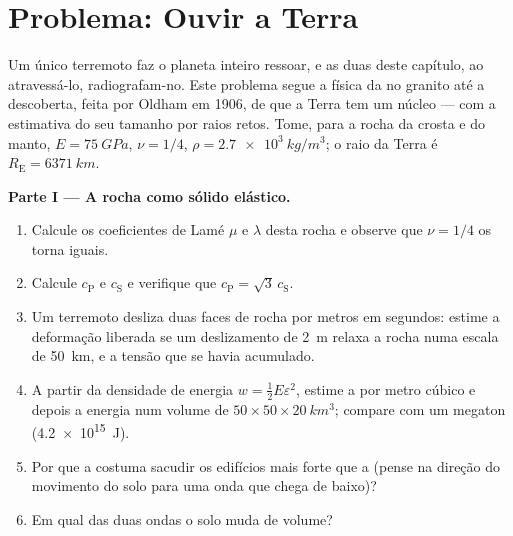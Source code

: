 \section{Problema: Ouvir a Terra}

\begin{problem}\label{pb:b3:continuum-elasticity:1}
Um único terremoto faz o planeta inteiro ressoar, e as duas  deste capítulo, ao atravessá-lo, radiografam-no. Este
problema segue a física da  no granito até a descoberta,
feita por Oldham em 1906, de que a Terra tem um núcleo --- com a
estimativa do seu tamanho por raios retos. Tome, para a rocha da
crosta e do manto, $E = \qty{75}{GPa}$, $\nu = 1/4$,
$\rho = \qty{2.7e3}{kg/m^3}$; o raio da Terra é $R_{\text{E}} =
\qty{6371}{km}$.

\medskip\noindent\textbf{Parte I --- A rocha como sólido elástico.}
\begin{enumerate}
  \item Calcule os coeficientes de Lamé $\mu$ e $\lambda$ desta rocha
        e observe que $\nu = 1/4$ os torna iguais.
  \item Calcule $c_{\text{P}}$ e $c_{\text{S}}$ e verifique que
        $c_{\text{P}} = \sqrt3\,c_{\text{S}}$.
  \item Um terremoto desliza duas faces de rocha por metros em
        segundos: estime a deformação liberada se um deslizamento de
        \qty{2}{m} relaxa a rocha numa escala de \qty{50}{km}, e a
        tensão que se havia acumulado.
  \item A partir da densidade de energia $w = \tfrac12 E\varepsilon^2$,
        estime a  por metro cúbico e depois a energia
        num volume de $50 \times 50 \times \qty{20}{km^3}$; compare
        com um megaton (\qty{4.2e15}{J}).
  \item Por que a  costuma sacudir os edifícios mais forte que a
         (pense na direção do movimento do solo para uma onda
        que chega de baixo)?
  \item Em qual das duas ondas o solo muda de volume?
\end{enumerate}


\end{problem}
